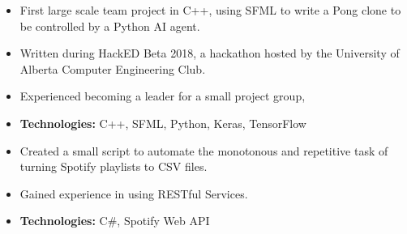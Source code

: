 \documentclass[10pt,letterpaper,ragged2e,academicons]{altacv}
\begin{document}
\begin{itemize}
  \item First large scale team project in C++, using SFML to write a Pong clone to be controlled by a Python AI agent.
  \item Written during HackED Beta 2018, a hackathon hosted by the University of Alberta Computer Engineering Club.
  \item Experienced becoming a leader for a small project group, 
  \item \textbf{Technologies:} C++, SFML, Python, Keras, TensorFlow
\end{itemize}
\divider\small

\begin{itemize}
  \item Created a small script to automate the monotonous and repetitive task of turning Spotify playlists to CSV files.
  \item Gained experience in using RESTful Services.
  \item \textbf{Technologies:} C\#, Spotify Web API
\end{itemize}
\divider\small

\clearpage
\nocite{*}
\end{document}

